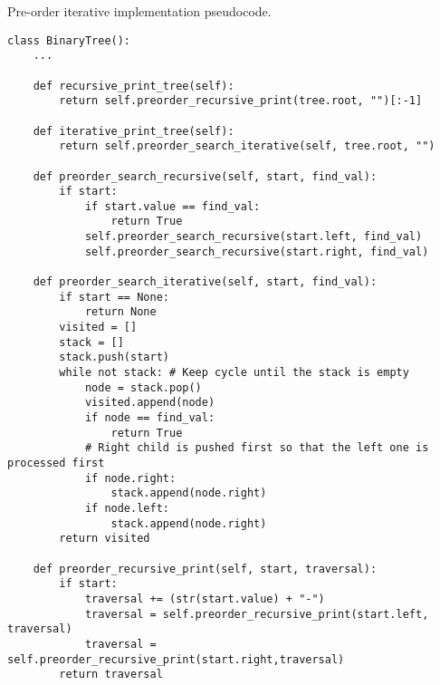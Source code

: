 \begin{algorithm}[H]
	\DontPrintSemicolon
	\LinesNumbered
  	\;
\caption{Pre-order iterative implementation pseudocode.}
\end{algorithm}

\begin{lstlisting}[firstnumber=1, caption={Recursive and iterative implementation of pre-order traversal.}]
class BinaryTree():
	...

	def recursive_print_tree(self):
		return self.preorder_recursive_print(tree.root, "")[:-1]
	
	def iterative_print_tree(self):
		return self.preorder_search_iterative(self, tree.root, "")

	def preorder_search_recursive(self, start, find_val):
		if start:
			if start.value == find_val:
				return True
			self.preorder_search_recursive(start.left, find_val)
			self.preorder_search_recursive(start.right, find_val)

	def preorder_search_iterative(self, start, find_val):
		if start == None:
			return None
		visited = []		
		stack = []
		stack.push(start)
		while not stack: # Keep cycle until the stack is empty
			node = stack.pop()
			visited.append(node)
			if node == find_val:
				return True
			# Right child is pushed first so that the left one is processed first
			if node.right:
				stack.append(node.right)
			if node.left:
				stack.append(node.right)
		return visited

	def preorder_recursive_print(self, start, traversal):
		if start:
			traversal += (str(start.value) + "-")
			traversal = self.preorder_recursive_print(start.left, traversal)
			traversal = self.preorder_recursive_print(start.right,traversal)
		return traversal
\end{lstlisting}

